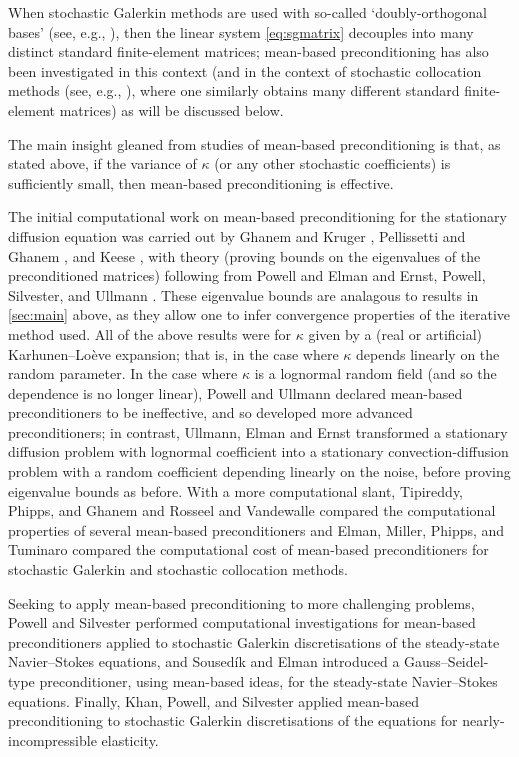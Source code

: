 When stochastic Galerkin methods are used with so-called `doubly-orthogonal bases' (see, e.g., \cite[Section 3.2]{ErPoSiUl:09}), then the linear system \cref{eq:sgmatrix} decouples into many distinct standard finite-element matrices; mean-based preconditioning has also been investigated in this context (and in the context of stochastic collocation methods (see, e.g., \cite{BaNoTe:07}), where one similarly obtains many different standard finite-element matrices) as will be discussed below.

The main insight gleaned from studies of mean-based preconditioning is that, as stated above, if the variance of $\kappa$ (or any other stochastic coefficients) is sufficiently small, then mean-based preconditioning is effective.

The initial computational work on mean-based preconditioning for the stationary diffusion equation was carried out by Ghanem and Kruger \cite{GhKr:96}, Pellissetti and Ghanem \cite{PeGh:00}, and Keese \cite{Ke:04}, with theory (proving bounds on the eigenvalues of the preconditioned matrices) following from Powell and Elman \cite{PoEl:09} and Ernst, Powell, Silvester, and Ullmann \cite{ErPoSiUl:09}. These eigenvalue bounds are analagous to results in \cref{sec:main} above, as they allow one to infer convergence properties of the iterative method used. All of the above results were for $\kappa$ given by a (real or artificial) Karhunen--Lo\`eve expansion; that is, in the case where $\kappa$ depends linearly on the random parameter. In the case where $\kappa$ is a lognormal random field (and so the dependence is no longer linear), Powell and Ullmann \cite{PoUl:10} declared mean-based preconditioners to be ineffective, and so developed more advanced preconditioners; in contrast, Ullmann, Elman and Ernst \cite{UlElEr:12} transformed a stationary diffusion problem with lognormal coefficient into a stationary convection-diffusion problem with a random coefficient depending linearly on the noise, before proving eigenvalue bounds as before. With a more computational slant, Tipireddy, Phipps, and Ghanem \cite{TiPhGh:10} and Rosseel and Vandewalle \cite{RoVa:10} compared the computational properties of several mean-based preconditioners and Elman, Miller, Phipps, and Tuminaro \cite{ElMiPhTu:11} compared the computational cost of mean-based preconditioners for stochastic Galerkin and stochastic collocation methods.

Seeking to apply mean-based preconditioning to more challenging problems, Powell and Silvester \cite{PoSi:12} performed computational investigations for mean-based preconditioners applied to stochastic Galerkin discretisations of the steady-state Navier--Stokes equations, and Soused\'ik and Elman \cite{SoEl:16} introduced a Gauss--Seidel-type preconditioner, using mean-based ideas, for the steady-state Navier--Stokes equations. Finally, Khan, Powell, and Silvester \cite{KhPoSi:19} applied mean-based preconditioning to stochastic Galerkin discretisations of the equations for nearly-incompressible elasticity.

